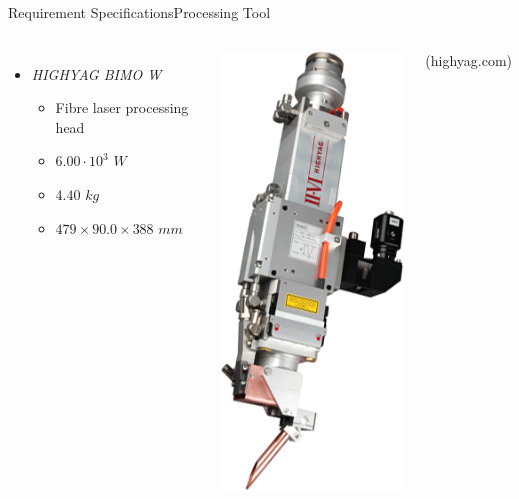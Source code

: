 \begin{frame}{Requirement Specifications}{Processing Tool}
\begin{columns}
\begin{itemize}
    \item \textit{HIGHYAG BIMO W}
        \begin{itemize}
            \item Fibre laser processing head
            \item $6.00\cdot10^{3}$ $W$
            \item $4.40$ $kg$
            \item $479 \times 90.0 \times 388$ $mm$
        \end{itemize}   
\end{itemize}
\centering
\includegraphics[width=.65\textwidth]{graphics/andrej/bimo}

\tiny{(highyag.com)}
\end{columns}
\end{frame}

